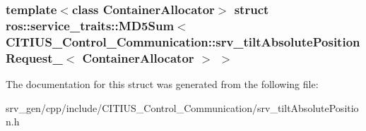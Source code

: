 \subsubsection*{template$<$class Container\-Allocator$>$ struct ros\-::service\-\_\-traits\-::\-M\-D5\-Sum$<$ C\-I\-T\-I\-U\-S\-\_\-\-Control\-\_\-\-Communication\-::srv\-\_\-tilt\-Absolute\-Position\-Request\-\_\-$<$ Container\-Allocator $>$ $>$}



\-The documentation for this struct was generated from the following file\-:\begin{DoxyCompactItemize}
\item 
srv\-\_\-gen/cpp/include/\-C\-I\-T\-I\-U\-S\-\_\-\-Control\-\_\-\-Communication/srv\-\_\-tilt\-Absolute\-Position.\-h\end{DoxyCompactItemize}
